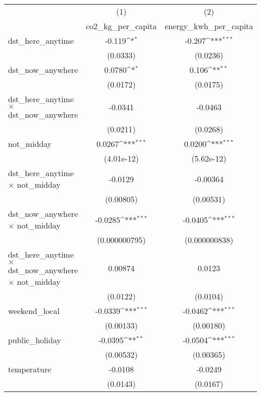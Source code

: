 {
\def\sym#1{\ifmmode^{#1}\else\(^{#1}\)\fi}
\begin{tabular}{l*{2}{c}}
\hline\hline
                    &\multicolumn{1}{c}{(1)}&\multicolumn{1}{c}{(2)}\\
                    &\multicolumn{1}{c}{co2\_kg\_per\_capita}&\multicolumn{1}{c}{energy\_kwh\_per\_capita}\\
\hline
dst\_here\_anytime    &      -0.119\sym{*}  &      -0.207\sym{***}\\
                    &    (0.0333)         &    (0.0236)         \\
[1em]
dst\_now\_anywhere    &      0.0780\sym{*}  &       0.106\sym{**} \\
                    &    (0.0172)         &    (0.0175)         \\
[1em]
dst\_here\_anytime $\times$ dst\_now\_anywhere&     -0.0341         &     -0.0463         \\
                    &    (0.0211)         &    (0.0268)         \\
[1em]
not\_midday          &      0.0267\sym{***}&      0.0200\sym{***}\\
                    &  (4.01e-12)         &  (5.62e-12)         \\
[1em]
dst\_here\_anytime $\times$ not\_midday&     -0.0129         &    -0.00364         \\
                    &   (0.00805)         &   (0.00531)         \\
[1em]
dst\_now\_anywhere $\times$ not\_midday&     -0.0285\sym{***}&     -0.0405\sym{***}\\
                    &(0.000000795)         &(0.000000838)         \\
[1em]
dst\_here\_anytime $\times$ dst\_now\_anywhere $\times$ not\_midday&     0.00874         &      0.0123         \\
                    &    (0.0122)         &    (0.0104)         \\
[1em]
weekend\_local       &     -0.0339\sym{***}&     -0.0462\sym{***}\\
                    &   (0.00133)         &   (0.00180)         \\
[1em]
public\_holiday      &     -0.0395\sym{**} &     -0.0504\sym{***}\\
                    &   (0.00532)         &   (0.00365)         \\
[1em]
temperature         &     -0.0108         &     -0.0249         \\
                    &    (0.0143)         &    (0.0167)         \\

\end{tabular}}
